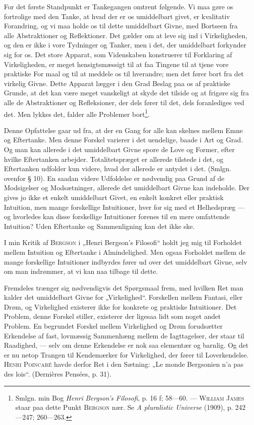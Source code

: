 \documentclass[12pt]{article}
\newcommand{\opage}[1]{\marginnote{\footnotesize\textit{[#1]}}}
\begin{document}
For det første Standpunkt er Tankegangen omtrent følgende. Vi maa gøre os
fortrolige med den Tanke, at hvad der er os umiddelbart givet, er kvalitativ
Forandring, og vi maa holde os til dette umiddelbart Givne, med Bortseen fra
alle Abstraktioner og Reflektioner. Det gælder om at leve sig ind i
Virkeligheden, og den er ikke i vore Tydninger og Tanker, men i det, der
umiddelbart forkynder sig for os. Det store Apparat, som Videnskaben konstruerer
til Forklaring af Virkeligheden, er meget hensigtsmæssigt til at faa Tingene til
at tjene vore praktiske For%
\setcounter{footnote}{0}%
\opage{46}maal og til at meddele os til hverandre; men det fører bort fra det
virkelig Givne. Dette Apparat lægger i den Grad Beslag paa os af praktiske
Grunde, at det kan være meget vanskeligt at skyde det tilside og at frigøre sig
fra alle de Abstraktioner og Refleksioner, der dels fører til det, dels
foranlediges ved det. Men lykkes det, falder alle Problemer bort\footnote{Smlgn.
min Bog \textit{Henri Bergson's Filosofi}, p. 16 f; 58---60. --- \textsc{William
James} staar paa dette Punkt \textsc{Bergson} nær. Se \textit{A pluralistic
Universe} (1909), p. 242---247; 260---263.}.

Denne Opfattelse gaar ud fra, at der en Gang for alle kan skelnes mellem Emne og
Eftertanke. Men denne Forskel varierer i det uendelige, baade i Art og Grad. Og
man kan allerede i det umiddelbart Givne spore de Love og Former, efter hvilke
Eftertanken arbejder. Totalitetspræget er allerede tilstede i det, og
Eftertanken udfolder kun videre, hvad der allerede er antydet i det. (Smlgn.
ovenfor § 10). En saadan videre Udfoldelse er nødvendig paa Grund af de
Modsigelser og Modsætninger, allerede det umiddelbart Givne kan indeholde. Der
gives jo ikke et enkelt umiddelbart Givet, en enkelt konkret eller praktisk
Intuition, men mange forskellige Intuitioner, hver for sig med et Helhedspræg
--- og hvorledes kan disse forskellige Intuitioner forenes til en mere
omfattende Intuition? Uden Eftertanke og Sammenligning kan det ikke ske.

I min Kritik af \textsc{Bergson} i „Henri Bergson's Filosofi“ holdt jeg mig til
Forholdet mellem Intuition og Eftertanke i Almindelighed. Men ogsaa Forholdet
mellem de mange forskellige Intuitioner indbyrdes fører ud over det umiddelbart
Givne, selv om man indrømmer, at vi kan naa tilbage til dette.

Fremdeles trænger sig nødvendigvis det Spørgsmaal frem, med hvilken Ret man
kalder det umiddelbart Givne for „Virkelighed“. Forskellen mellem Fantasi, eller
Drøm, og Virkelighed existerer ikke for konkrete og praktiske Intuitioner. Det
Problem, denne Forskel stiller, existerer der ligesaa lidt som noget andet
Problem. En begrundet Forskel mellem Virkelighed og Drøm forudsætter Erkendelse
af fast, lovmæssig Sammenhæng mellem de Iagttagelser, der staar til Raadighed,
--- selv om denne Erkendelse er nok saa elementær og barnlig. Og det er nu netop
Trangen til Kendemærker for Virkelighed, der fører til Loverkendelse.
\textsc{Henri Poincaré} havde derfor Ret i den Sætning: „Le monde Bergsonien n'a
pas des lois“. (Dernières
Pensées, p. 31).
\end{document}
